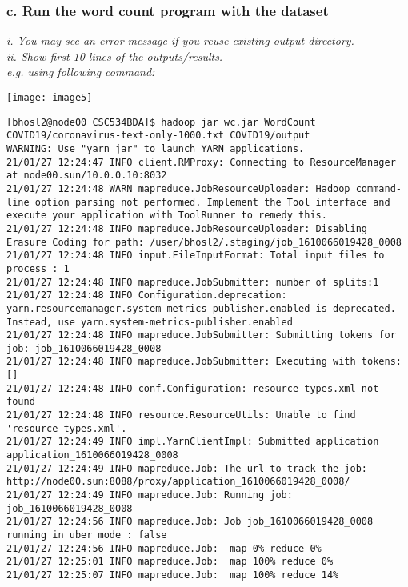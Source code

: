 \documentclass[]{article}
\begin{document}
\subsubsection*{c. Run the word count program with the dataset}
\emph{i. You may see an error message if you reuse existing output directory. \\
	ii. Show first 10 lines of the outputs/results. \\ 
	e.g. using following command: }


\texttt{[image: image5]} \vspace{-1em}
\begin{verbatim}
[bhosl2@node00 CSC534BDA]$ hadoop jar wc.jar WordCount COVID19/coronavirus-text-only-1000.txt COVID19/output
WARNING: Use "yarn jar" to launch YARN applications.
21/01/27 12:24:47 INFO client.RMProxy: Connecting to ResourceManager at node00.sun/10.0.0.10:8032
21/01/27 12:24:48 WARN mapreduce.JobResourceUploader: Hadoop command-line option parsing not performed. Implement the Tool interface and execute your application with ToolRunner to remedy this.
21/01/27 12:24:48 INFO mapreduce.JobResourceUploader: Disabling Erasure Coding for path: /user/bhosl2/.staging/job_1610066019428_0008
21/01/27 12:24:48 INFO input.FileInputFormat: Total input files to process : 1
21/01/27 12:24:48 INFO mapreduce.JobSubmitter: number of splits:1
21/01/27 12:24:48 INFO Configuration.deprecation: yarn.resourcemanager.system-metrics-publisher.enabled is deprecated. Instead, use yarn.system-metrics-publisher.enabled
21/01/27 12:24:48 INFO mapreduce.JobSubmitter: Submitting tokens for job: job_1610066019428_0008
21/01/27 12:24:48 INFO mapreduce.JobSubmitter: Executing with tokens: []
21/01/27 12:24:48 INFO conf.Configuration: resource-types.xml not found
21/01/27 12:24:48 INFO resource.ResourceUtils: Unable to find 'resource-types.xml'.
21/01/27 12:24:49 INFO impl.YarnClientImpl: Submitted application application_1610066019428_0008
21/01/27 12:24:49 INFO mapreduce.Job: The url to track the job: http://node00.sun:8088/proxy/application_1610066019428_0008/
21/01/27 12:24:49 INFO mapreduce.Job: Running job: job_1610066019428_0008
21/01/27 12:24:56 INFO mapreduce.Job: Job job_1610066019428_0008 running in uber mode : false
21/01/27 12:24:56 INFO mapreduce.Job:  map 0% reduce 0%
21/01/27 12:25:01 INFO mapreduce.Job:  map 100% reduce 0%
21/01/27 12:25:07 INFO mapreduce.Job:  map 100% reduce 14%

\end{verbatim}
\end{document}
